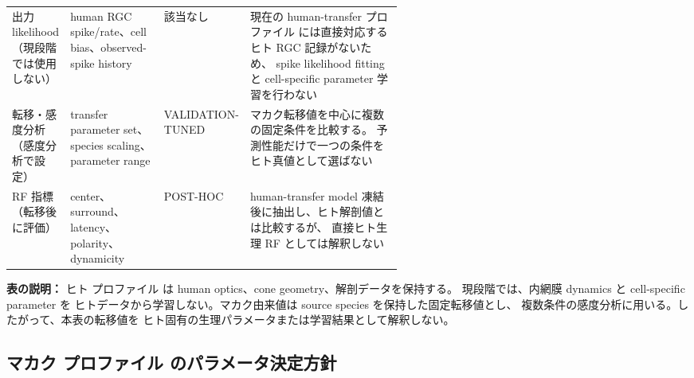 \documentclass[a4paper,10pt,twocolumn,uplatex,dvipdfmx]{jsarticle}
\begin{document}
\begin{tabularx}{0.98\linewidth}{
  >{\raggedright\arraybackslash}p{0.14\linewidth}
  >{\raggedright\arraybackslash}p{0.24\linewidth}
  >{\raggedright\arraybackslash}p{0.19\linewidth}
  Y}
出力 likelihood\newline（現段階では使用しない） &
human RGC spike/rate、cell bias、observed-spike history &
該当なし &
現在の human-transfer プロファイル には直接対応するヒト RGC 記録がないため、
spike likelihood fitting と cell-specific parameter 学習を行わない \\

転移・感度分析\newline（感度分析で設定） &
transfer parameter set、species scaling、parameter range &
VALIDATION-TUNED &
マカク転移値を中心に複数の固定条件を比較する。
予測性能だけで一つの条件をヒト真値として選ばない \\

RF 指標\newline（転移後に評価） &
center、surround、latency、polarity、dynamicity &
POST-HOC &
human-transfer model 凍結後に抽出し、ヒト解剖値とは比較するが、
直接ヒト生理 RF としては解釈しない \\
\bottomrule
\end{tabularx}

\vspace{0.6\baselineskip}
\noindent\textbf{表の説明：}
ヒト プロファイル は human optics、cone geometry、解剖データを保持する。
現段階では、内網膜 dynamics と cell-specific parameter を
ヒトデータから学習しない。マカク由来値は source species を保持した固定転移値とし、
複数条件の感度分析に用いる。したがって、本表の転移値を
ヒト固有の生理パラメータまたは学習結果として解釈しない。

\clearpage
\subsection*{マカク プロファイル のパラメータ決定方針}

\label{tab:model-policy-macaque}
\end{document}
